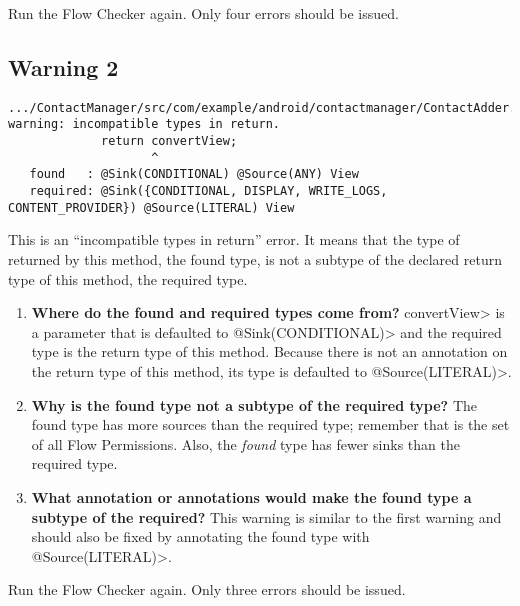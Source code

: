  Run the Flow Checker again.  Only four errors should be issued.
 
 \subsection{Warning 2}
 \begin{Verbatim}
.../ContactManager/src/com/example/android/contactmanager/ContactAdder.java:387: 
warning: incompatible types in return.
             return convertView;
                    ^
   found   : @Sink(CONDITIONAL) @Source(ANY) View
   required: @Sink({CONDITIONAL, DISPLAY, WRITE_LOGS, CONTENT_PROVIDER}) @Source(LITERAL) View
\end{Verbatim} 
This is an ``incompatible types in return'' error.  It means that the type
of returned by this method, the found type, is not a subtype of the declared 
return type of this method, the required type.
 \begin{enumerate}

\item\textbf{Where do the found and required types come from?}
\<convertView> is a parameter that is defaulted to \<@Sink(CONDITIONAL)> and 
the required type is the return type of this method. Because there is not an
annotation on the return type of this method, its type is defaulted to \<@Source(LITERAL)>.

  \item\textbf{ Why is the found type not a subtype of the required type?}
The found type has more sources than the required type; remember that 
is the set of all Flow Permissions. Also, the \emph{found} type has fewer sinks 
than the required type.

  \item\textbf{What annotation or annotations would make the found type a
   subtype of the required?} This warning is similar to the first warning and 
   should also be fixed by annotating the found type with \<@Source(LITERAL)>.\newline
  
   \end{enumerate}

   Run the Flow Checker again.  Only three errors should be issued.


